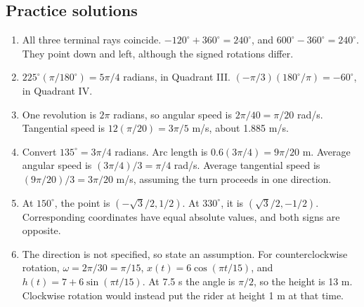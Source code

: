 \subsection{Practice solutions}
\begin{enumerate}
\item All three terminal rays coincide. \(-120^\circ+360^\circ=240^\circ\), and \(600^\circ-360^\circ=240^\circ\). They point down and left, although the signed rotations differ.
\item \(225^\circ(\pi/180^\circ)=5\pi/4\) radians, in Quadrant III. \((-\pi/3)(180^\circ/\pi)=-60^\circ\), in Quadrant IV.
\item One revolution is \(2\pi\) radians, so angular speed is \(2\pi/40=\pi/20\) rad/s. Tangential speed is \(12(\pi/20)=3\pi/5\) m/s, about 1.885 m/s.
\item Convert \(135^\circ=3\pi/4\) radians. Arc length is \(0.6(3\pi/4)=9\pi/20\) m. Average angular speed is \((3\pi/4)/3=\pi/4\) rad/s. Average tangential speed is \((9\pi/20)/3=3\pi/20\) m/s, assuming the turn proceeds in one direction.
\item At \(150^\circ\), the point is \((-\sqrt3/2,1/2)\). At \(330^\circ\), it is \((\sqrt3/2,-1/2)\). Corresponding coordinates have equal absolute values, and both signs are opposite.
\item The direction is not specified, so state an assumption. For counterclockwise rotation, \(\omega=2\pi/30=\pi/15\), \(x(t)=6\cos(\pi t/15)\), and \(h(t)=7+6\sin(\pi t/15)\). At 7.5 s the angle is \(\pi/2\), so the height is 13 m. Clockwise rotation would instead put the rider at height 1 m at that time.
\end{enumerate}

